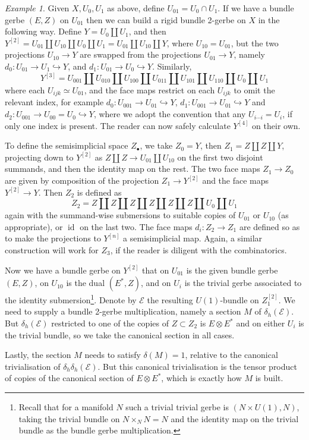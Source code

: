 \documentclass[12pt]{amsart}
\DeclareMathOperator{\id}{id}
\theoremstyle{plain}
\theoremstyle{definition}
\theoremstyle{remark}
\newtheorem{example}[theorem]{Example}
\numberwithin{equation}{section}
\newcommand{\<}{\langle}
\renewcommand{\>}{\rangle}
\def\into {\hookrightarrow}
\begin{document}
\begin{example}
Given $X,U_0,U_1$ as above, define $U_{01} = U_0\cap U_1$.
If we have a bundle gerbe $(E,Z)$ on $U_{01}$ then we can build a rigid bundle 2-gerbe on $X$ in the following way.
Define $Y = U_0\amalg U_1$, and then $Y^{[2]} = U_{01} \amalg U_{10} \amalg U_0 \amalg U_1=U_{01} \amalg U_{10} \amalg Y$, where $U_{10} = U_{01}$, but the two projections $U_{10} \to Y$ are swapped from the projections $U_{01} \to Y$, namely $d_0\colon U_{01}\to U_1 \into Y$, and $d_1\colon U_{01}\to U_0 \into Y$.
Similarly,
\[
  Y^{[3]} = U_{001} \amalg U_{010}\amalg U_{100} \amalg 
  U_{011} \amalg U_{101}\amalg U_{110} \amalg  U_0 \amalg U_1
\]
where each $U_{ijk}\simeq U_{01}$, and the face maps restrict on each $U_{ijk}$ to omit the relevant index, for example $d_0\colon U_{001}\to U_{01}\into Y$, $d_1\colon U_{001}\to U_{01}\into Y$ and $d_2\colon U_{001}\to U_{00}=U_0\into Y$, where we adopt the convention that any $U_{i\cdots i} = U_i$, if only one index is present.
The reader can now safely calculate $Y^{[4]}$ on their own.

To define the semisimplicial space $Z_\bullet$, we take $Z_0=Y$, then $Z_1 = Z\amalg Z \amalg Y$, projecting down to $Y^{[2]}$ as $Z\amalg Z \to U_{01}\amalg U_{10}$ on the first two disjoint summands, and then the identity map on the rest. The two face maps $Z_1 \to Z_0$ are given by composition of the projection $Z_1\to Y^{[2]}$ and the face maps $Y^{[2]} \to Y$.
Then $Z_2$ is defined as 
\[
  Z_2 = Z \amalg Z \amalg Z \amalg Z \amalg Z \amalg Z \amalg U_0 \amalg U_1
\]
again with the summand-wise submersions to suitable copies of $U_{01}$ or $U_{10}$ (as appropriate), or $\id$ on the last two. The face maps $d_i\colon Z_2\to Z_1$ are defined so as to make the projections to $Y^{[n]}$ a semisimplicial map.
Again, a similar construction will work for $Z_3$, if the reader is diligent with the combinatorics.

Now we have a bundle gerbe on $Y^{[2]}$ that on $U_{01}$ is the given bundle gerbe $(E,Z)$, on $U_{10}$ is the dual $(E^*,Z)$, and on $U_i$ is the trivial gerbe associated to the identity submersion\footnote{Recall that for a manifold $N$ such a trivial trivial gerbe is $(N\times U(1),N)$, taking the trivial bundle on $N\times_N N = N$ and the identity map on the trivial bundle as the bundle gerbe multiplication.}. Denote by $\mathcal{E}$ the resulting $U(1)$-bundle on $Z_1^{[2]}$. We need to supply a bundle 2-gerbe multiplication, namely a section $M$ of $\delta_h(\mathcal{E})$.
But $\delta_h(\mathcal{E})$ restricted to one of the copies of $Z \subset Z_2$ is $E\otimes E^*$ and on either $U_i$ is the trivial bundle, so we take the canonical section in all cases.

Lastly, the section $M$ needs to satisfy $\delta(M) = 1$, relative to the canonical trivialisation of $\delta_h\delta_h(\mathcal{E})$. But this canonical trivialisation is the tensor product of copies of the canonical section of $E\otimes E^*$, which is exactly how $M$ is built.
\end{example}
\end{document}

